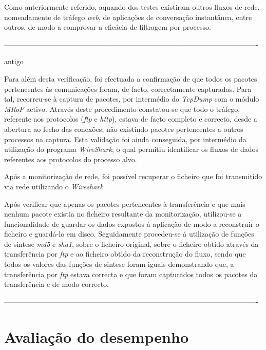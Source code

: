Como anteriormente referido, aquando dos testes existiram outros fluxos de rede, nomeadamente de tráfego \textit{web}, de aplicações de conversação instantânea, entre outros, de modo a comprovar a eficácia de filtragem por processo.

----------------------------------------------------------------------------------------------------------

antigo

Para além desta verificação, foi efectuada a confirmação de que todos os pacotes pertencentes às comunicações foram, de facto, correctamente capturadas.
Para tal, recorreu-se à captura de pacotes, por intermédio do \textit{TcpDump} com o módulo \textit{MRoP} activo.
Através deste procedimento constatou-se que todo o tráfego, referente aos protocolos (\textit{ftp} e \textit{http}), estava de facto completo e correcto, desde a abertura ao fecho das conexões, não existindo pacotes pertencentes a outros processos na captura.
Esta validação foi ainda conseguida, por intermédio da utilização do programa \textit{WireShark}, o qual permitiu identificar os fluxos de dados referentes aos protocolos do processo alvo.

Após a monitorização de rede, foi possível recuperar o ficheiro que foi transmitido via rede utilizando o \textit{Wireshark}


Após verificar que apenas os pacotes pertencentes à transferência e que mais nenhum pacote existia no ficheiro resultante da monitorização, utilizou-se a funcionalidade de guardar os dados expostos à aplicação de modo a reconstruir o ficheiro e guardá-lo em disco.
Seguidamente procedeu-se à utilização de funções de sintese \textit{md5} e \textit{sha1}, sobre o ficheiro original, sobre o ficheiro obtido através da transferência por \textit{ftp} e ao ficheiro obtido da reconstrução do fluxo, sendo que todos os valores das funções de sintese foram iguais demonstrando que, a transferência por \textit{ftp} estava correcta e que foram capturados todos os pacotes da transferência e de modo correcto.



----------------------------------------------------------------------------------------------------------


\section{Avaliação do desempenho}
\label{sec:eval_performance}

